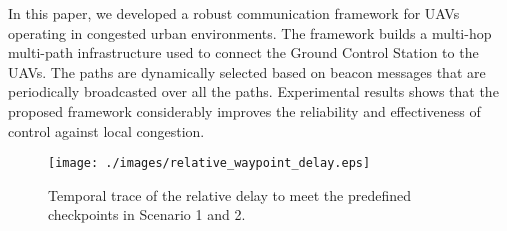In this paper, we developed a robust communication framework for UAVs operating in congested urban environments. The framework builds a multi-hop multi-path infrastructure used to connect the Ground Control Station to the UAVs. The paths are dynamically selected based on beacon messages that are periodically broadcasted over all the paths.
Experimental results shows that the proposed framework considerably improves the reliability and effectiveness of control against local congestion.

\begin{figure}[t]
   \centering
   \texttt{[image: ./images/relative\_waypoint\_delay.eps]}
   \vspace{-4mm}
   \caption{Temporal trace of the relative delay to meet the predefined checkpoints in Scenario 1 and 2.}
   \vspace{-4mm}
   \label{fig:rel_way_delay}
\end{figure}